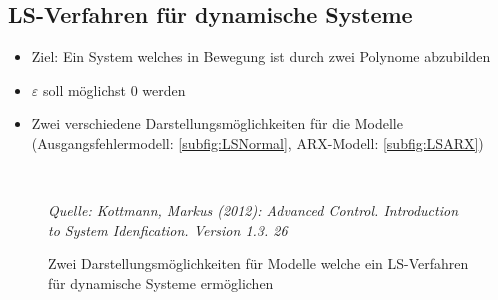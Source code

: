 \subsection{LS-Verfahren für dynamische Systeme}
\label{subsec:LSDynSys}
\begin{itemize}
	\item Ziel: Ein System welches in Bewegung ist durch zwei Polynome abzubilden
	\item $\varepsilon$ soll möglichst 0 werden
	\item Zwei verschiedene Darstellungsmöglichkeiten für die Modelle (Ausgangsfehlermodell: \ref{subfig:LSNormal}, ARX-Modell: \ref{subfig:LSARX})
\end{itemize}
\begin{figure}[!h]
	\centering
	\hspace{0.1\linewidth} 
	\\
	\caption{Zwei Darstellungsmöglichkeiten für Modelle welche ein LS-Verfahren für dynamische Systeme ermöglichen}
	\textit{Quelle: Kottmann, Markus (2012): Advanced Control. Introduction to System Idenfication. Version 1.3. 26}
	\label{fig:LS}
\end{figure}


